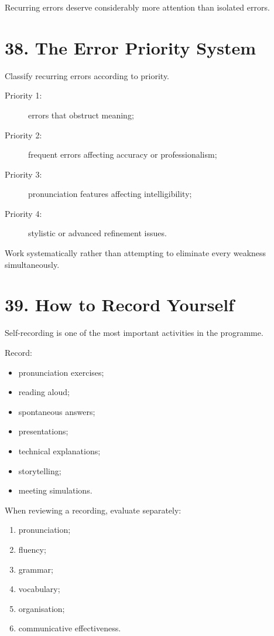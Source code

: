 Recurring errors deserve considerably more attention than isolated errors.

\section*{38. The Error Priority System}

Classify recurring errors according to priority.

\begin{description}
    \item[Priority 1:] errors that obstruct meaning;
    \item[Priority 2:] frequent errors affecting accuracy or professionalism;
    \item[Priority 3:] pronunciation features affecting intelligibility;
    \item[Priority 4:] stylistic or advanced refinement issues.
\end{description}

Work systematically rather than attempting to eliminate every weakness simultaneously.

\section*{39. How to Record Yourself}

Self-recording is one of the most important activities in the programme.

Record:

\begin{itemize}
    \item pronunciation exercises;
    \item reading aloud;
    \item spontaneous answers;
    \item presentations;
    \item technical explanations;
    \item storytelling;
    \item meeting simulations.
\end{itemize}

When reviewing a recording, evaluate separately:

\begin{enumerate}
    \item pronunciation;
    \item fluency;
    \item grammar;
    \item vocabulary;
    \item organisation;
    \item communicative effectiveness.
\end{enumerate}

